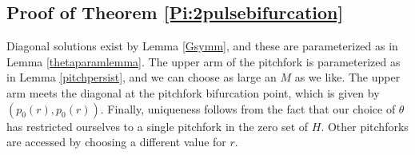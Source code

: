 \documentclass[thesis.tex]{subfiles}
\begin{document}
\subsection{Proof of Theorem \ref{Pi:2pulsebifurcation}}

Diagonal solutions exist by Lemma \ref{Gsymm}, and these are parameterized as in Lemma \ref{thetaparamlemma}. The upper arm of the pitchfork is parameterized as in Lemma \ref{pitchpersist}, and we can choose as large an $M$ as we like. The upper arm meets the diagonal at the pitchfork bifurcation point, which is given by $(p_0(r), p_0(r))$. Finally, uniqueness follows from the fact that our choice of $\theta$ has restricted ourselves to a single pitchfork in the zero set of $H$. Other pitchforks are accessed by choosing a different value for $r$.



\end{document}
